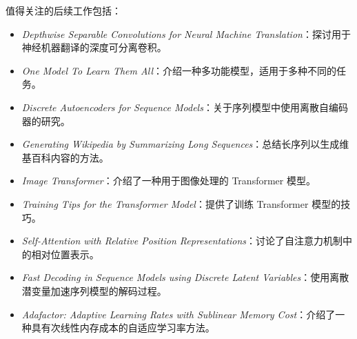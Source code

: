 \documentclass[cn,hazy,blue,10pt,normal]{elegantnote}
\begin{document}
值得关注的后续工作包括：
\begin{itemize}
    \item \textit{Depthwise Separable Convolutions for Neural Machine Translation}：探讨用于神经机器翻译的深度可分离卷积。
    \item \textit{One Model To Learn Them All}：介绍一种多功能模型，适用于多种不同的任务。
    \item \textit{Discrete Autoencoders for Sequence Models}：关于序列模型中使用离散自编码器的研究。
    \item \textit{Generating Wikipedia by Summarizing Long Sequences}：总结长序列以生成维基百科内容的方法。
    \item \textit{Image Transformer}：介绍了一种用于图像处理的 Transformer 模型。
    \item \textit{Training Tips for the Transformer Model}：提供了训练 Transformer 模型的技巧。
    \item \textit{Self-Attention with Relative Position Representations}：讨论了自注意力机制中的相对位置表示。
    \item \textit{Fast Decoding in Sequence Models using Discrete Latent Variables}：使用离散潜变量加速序列模型的解码过程。
    \item \textit{Adafactor: Adaptive Learning Rates with Sublinear Memory Cost}：介绍了一种具有次线性内存成本的自适应学习率方法。
\end{itemize}









\end{document}
